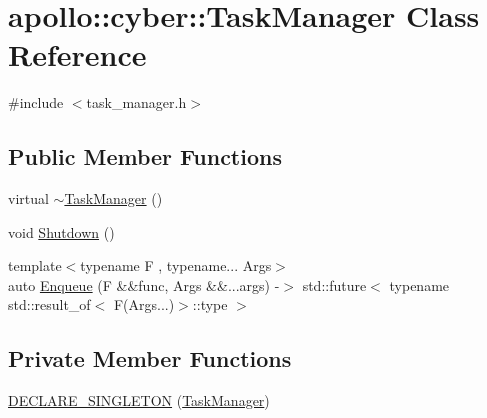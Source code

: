 \hypertarget{classapollo_1_1cyber_1_1TaskManager}{\section{apollo\-:\-:cyber\-:\-:Task\-Manager Class Reference}
\label{classapollo_1_1cyber_1_1TaskManager}
}


{\ttfamily \#include $<$task\-\_\-manager.\-h$>$}

\subsection*{Public Member Functions}
\begin{DoxyCompactItemize}
\item 
virtual \hyperlink{classapollo_1_1cyber_1_1TaskManager_aa55e5019fbec9c1e520f54f1ded6443d}{$\sim$\-Task\-Manager} ()
\item 
void \hyperlink{classapollo_1_1cyber_1_1TaskManager_a3892ccca0dfba0f188fda070fa18a07f}{Shutdown} ()
\item 
{\footnotesize template$<$typename F , typename... Args$>$ }\\auto \hyperlink{classapollo_1_1cyber_1_1TaskManager_a894d368b98a01e544ccaa3c15f315496}{Enqueue} (F \&\&func, Args \&\&...args) -\/$>$ std\-::future$<$ typename std\-::result\-\_\-of$<$ F(Args...)$>$\-::type $>$
\end{DoxyCompactItemize}
\subsection*{Private Member Functions}
\begin{DoxyCompactItemize}
\item 
\hyperlink{classapollo_1_1cyber_1_1TaskManager_adf05b6a7d15514a9b44deb3868f15b4e}{D\-E\-C\-L\-A\-R\-E\-\_\-\-S\-I\-N\-G\-L\-E\-T\-O\-N} (\hyperlink{classapollo_1_1cyber_1_1TaskManager}{Task\-Manager})
\end{DoxyCompactItemize}
